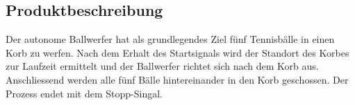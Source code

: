\subsection{Produktbeschreibung}
Der autonome Ballwerfer hat als grundlegendes Ziel fünf Tennisbälle in einen Korb zu werfen. Nach dem Erhalt des Startsignals wird der Standort des Korbes zur Laufzeit ermittelt und der Ballwerfer richtet sich nach dem Korb aus. Anschliessend werden alle fünf Bälle hintereinander in den Korb geschossen. Der Prozess endet mit dem Stopp-Singal.